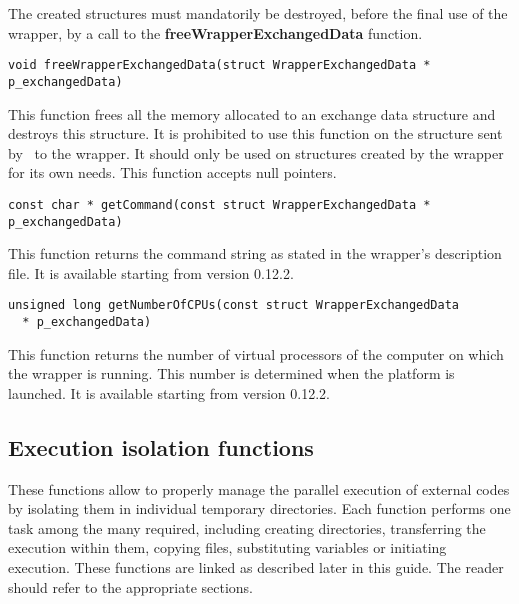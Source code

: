 The created structures must mandatorily be destroyed, before the final use of the wrapper, by a call to the {\bf freeWrapperExchangedData} function.

\lstset{language=C++, basicstyle=\normalsize}
\begin{lstlisting}[frame=TRBL]
  void freeWrapperExchangedData(struct WrapperExchangedData * p_exchangedData)
\end{lstlisting}

This function frees all the memory allocated to an exchange data structure and destroys this structure. It is prohibited to use this function on the structure sent by \OT\ to the wrapper. It should only be used on structures created by the wrapper for its own needs. This function accepts null pointers.

\lstset{language=C++, basicstyle=\normalsize}
\begin{lstlisting}[frame=TRBL]
  const char * getCommand(const struct WrapperExchangedData * p_exchangedData)
\end{lstlisting}

This function returns the command string as stated in the wrapper's description file. It is available starting from version 0.12.2.

\lstset{language=C++, basicstyle=\normalsize}
\begin{lstlisting}[frame=TRBL]
  unsigned long getNumberOfCPUs(const struct WrapperExchangedData
  * p_exchangedData)
\end{lstlisting}

This function returns the number of virtual processors of the computer on which the wrapper is running. This number is determined when the platform is launched. It is available starting from version 0.12.2.

\subsection{Execution isolation functions}

These functions allow to properly manage the parallel execution of external codes by isolating them in individual temporary directories. Each function performs one task among the many required, including creating directories, transferring the execution within them, copying files, substituting variables or initiating execution. These functions are linked as described later in this guide. The reader should refer to the appropriate sections.

